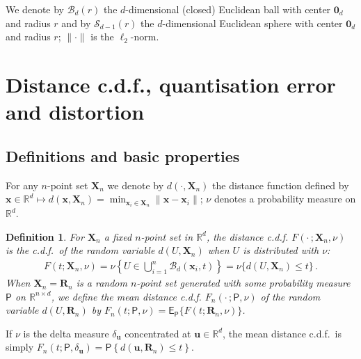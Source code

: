 \documentclass{article}
\def\Px{\mathsf{P}}
\def\RR{\mathds{R}}
\def\SX{{\mathscr X}}
\def\xb{\mathbf{x}}
\def\Xb{\mathbf{X}}
\def\Ex{\mathsf{E}}
\newcommand{\vsp} {\vspace{0.3cm}}
\def\SB{{\mathscr B}}
\def\SS{{\mathcal S}}
\def\0b{\mathbf{0}}
\newcommand{\bea}{\begin{eqnarray*}}
\newcommand{\eea}{\end{eqnarray*}}
\def\Rb{\mathbf{R}}
\def\ub{\mathbf{u}}
\newtheorem{definition}{Definition}[section]
\begin{document}
\vsp
We denote by $\SB_d(r)$ the $d$-dimensional (closed) Euclidean ball with center $\0b_d$ and radius $r$ %
and by $\SS_{d-1}(r)$ the $d$-dimensional Euclidean sphere with center $\0b_d$ and radius $r$; $\|\cdot\|$ is the $\ell_2$-norm.


\section{Distance c.d.f., quantisation error and distortion}\label{S:distancecdt-etc}



\subsection{Definitions and basic properties}

For any $n$-point set $\Xb_n$ we denote by $d(\cdot,\Xb_n)$ the distance function defined by $\xb\in\RR^d \mapsto d(\xb,\Xb_n)=\min_{\xb_i\in\Xb_n}\|\xb-\xb_i\|$; $\nu$ denotes a probability measure on $\RR^d$.

\begin{definition}\label{D:distance-cdf}
For $\Xb_n$ a fixed $n$-point set in $\RR^d$, the \emph{distance c.d.f.} $F(\cdot\,;\Xb_n,\nu)$ is the c.d.f.\ of the random variable $d(U,\Xb_n)$ when $U$ is distributed with $\nu$:
\bea %
F(t;\Xb_n,\nu) = \nu\left\{U\in \bigcup_{i=1}^n \SB_d(\xb_i,t)\right\}  = \nu\{d(U,\Xb_n) \leq t\}\,.
\eea
When $\Xb_n=\Rb_n$ is a random $n$-point set generated with some probability measure $\Px$ on $\RR^{n\times d}$, we define the \emph{mean distance c.d.f.} $F_n(\cdot\,; \Px,\nu)$ of the random variable $d(U,\Rb_n)$ by $F_n(t; \Px,\nu) = \Ex_\Px\{F(t;\Rb_n,\nu) \}$.
\end{definition}

If $\nu$ is the delta measure $\delta_\ub$ concentrated at $\ub\in\RR^d$, the mean distance c.d.f.\ is simply $F_n(t; \Px,\delta_\ub)=\Px \left\{ d(\ub,\Rb_n)\leq t  \right\}$.
\end{document}
